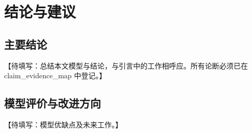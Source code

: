 \section{结论与建议}\label{sec:conclusions}

\subsection{主要结论}\label{subsec:main_conclusions}

【待填写：总结本文模型与结论，与引言中的工作相呼应。所有论断必须已在 claim_evidence_map 中登记。】

\subsection{模型评价与改进方向}\label{subsec:improvements}

【待填写：模型优缺点及未来工作。】
